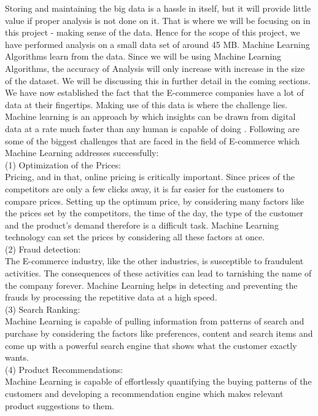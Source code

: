Storing and maintaining the big data is a hassle in itself, but it will provide little value if proper analysis is not done on it. That is where we will be focusing on in this project - making sense of the data. Hence for the scope of this project, we have performed analysis on a small data set of around 45 MB. Machine Learning Algorithms learn from the data. Since we will be using Machine Learning Algorithms, the accuracy of Analysis will only increase with increase in the size of the dataset. We will be discussing this in further detail in the coming sections.\\
We have now established the fact that the E-commerce companies have a lot of data at their fingertips. Making use of this data is where the challenge lies. Machine learning is an approach by which insights can be drawn from digital data at a rate much faster than any human is capable of doing \cite{link5} . Following are some of the biggest challenges that are faced in the field of E-commerce which Machine Learning addresses successfully:\\
(1) Optimization of the Prices:\\
Pricing, and in that, online pricing is critically important. Since prices of the competitors are only a few clicks away, it is far easier for the customers to compare prices. Setting up the optimum price, by considering many factors like the prices set by the competitors, the time of the day, the type of the customer and the product's demand therefore is a difficult task. Machine Learning technology can set the prices by considering all these factors at once.\\
(2) Fraud detection: \\
The E-commerce industry, like the other industries, is susceptible to fraudulent activities. The consequences of these activities can lead to tarnishing the name of the company forever. Machine Learning helps in detecting and preventing the frauds by processing the repetitive data at a high speed.\\
(3) Search Ranking: \\
Machine Learning is capable of pulling information from patterns of search and purchase by considering the factors like preferences, content and search items and come up with a powerful search engine that shows what the customer exactly wants. \\
(4) Product Recommendations: \\
Machine Learning is capable of effortlessly quantifying the buying patterns of the customers and developing a recommendation engine which makes relevant product suggestions to them. \\
